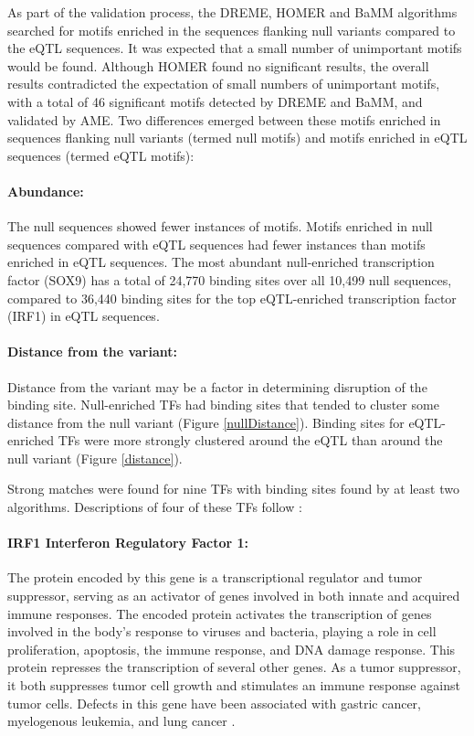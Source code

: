 \documentclass[12pt]{article}
\begin{document}
As part of the validation process, the DREME, HOMER and BaMM algorithms searched for motifs enriched in the sequences flanking null variants compared to the eQTL sequences. It was expected that a small number of unimportant motifs would be found. Although HOMER found no significant results, the overall results contradicted the expectation of small numbers of unimportant motifs, with a total of 46 significant motifs detected by DREME and BaMM, and validated by AME. Two differences emerged between these motifs enriched in sequences flanking null variants (termed null motifs) and motifs enriched in eQTL sequences (termed eQTL motifs):
\paragraph{Abundance:} 
The null sequences showed fewer instances of motifs. Motifs enriched in null sequences compared with eQTL sequences had fewer instances than motifs enriched in eQTL sequences. The most abundant null-enriched transcription factor (SOX9) has a total of 24,770 binding sites over all 10,499 null sequences, compared to 36,440 binding sites for the top eQTL-enriched transcription factor (IRF1) in eQTL sequences. 

\paragraph{Distance from the variant:} 
Distance from the variant may be a factor in determining disruption of the binding site. Null-enriched TFs had binding sites that tended to cluster some distance from the null variant (Figure \ref{nullDistance}). Binding sites for eQTL-enriched TFs were more strongly clustered around the eQTL than around the null variant (Figure \ref{distance}).

Strong matches were found for nine TFs with binding sites found by at least two algorithms. Descriptions of four of these TFs follow \citep{Weizmann2018}:

\paragraph{IRF1 Interferon Regulatory Factor 1:}
The protein encoded by this gene is a transcriptional regulator and tumor suppressor, serving as an activator of genes involved in both innate and acquired immune responses. The encoded protein activates the transcription of genes involved in the body's response to viruses and bacteria, playing a role in cell proliferation, apoptosis, the immune response, and DNA damage response. This protein represses the transcription of several other genes. As a tumor suppressor, it both suppresses tumor cell growth and stimulates an immune response against tumor cells. Defects in this gene have been associated with gastric cancer, myelogenous leukemia, and lung cancer \citep{Weizmann2018}.
\end{document}
